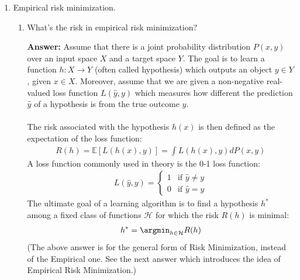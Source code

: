 \documentclass{article}
\newenvironment{QandA}{\begin{enumerate}[label=\arabic*.]}{\end{enumerate}}
\newenvironment{InnerQandA}{\begin{enumerate}[label=\roman*.]}{\end{enumerate}}
\newenvironment{answer}{\par\normalfont \textbf{Answer:}}{}
\newcommand{\Exp}[1]{\mathbb{E}\left[ #1 \right]}
\begin{document}
\begin{QandA}
\begin{answer}
        \textit{Active learning} is a branch of machine learning where a learning algorithm can interactively query a user (or some other information source) to label new data points with the desired outputs. (Source: \href{https://en.wikipedia.org/wiki/Active_learning}{Wikipedia}) \\\\
        \textit{Self-supervised learning} is a branch of machine learning that learns from unlabeled data by automatically extracting labels from the sample. For example, we could mask out a word in a sentence, which the algorithm then has to predict. (Source: \href{https://en.wikipedia.org/wiki/Self-supervised_learning}{Wikipedia})
    \end{answer}

    \item Empirical risk minimization.
    \begin{InnerQandA}
        \item What’s the risk in empirical risk minimization? 
        \begin{answer}
            Assume that there is a joint probability distribution $P(x, y)$ over an input space $X$ and a target space $Y$. The goal is to learn a function $h: X \rightarrow Y$ (often called hypothesis) which outputs an object $y \in Y$, given $x \in X$. Moreover, assume that we are given a non-negative real-valued loss function $L(\hat{y}, y)$ which measures how different the prediction $\hat{y}$ of a hypothesis is from the true outcome $y$. \\\\
            The risk associated with the hypothesis $h(x)$ is then defined as the expectation of the loss function:
            \begin{align*}
                R(h) = \Exp{L(h(x), y)} = \int L(h(x), y) dP(x, y)
            \end{align*}
            A loss function commonly used in theory is the 0-1 loss function:
            \begin{align*}
                L(\hat{y}, y) = \begin{cases}
                    1 &\text{if } \hat{y} \neq y \\
                    0 &\text{if } \hat{y} = y
                \end{cases}
            \end{align*}
            The ultimate goal of a learning algorithm is to find a hypothesis $h^*$ among a fixed class of functions $\mathcal{H}$ for which the risk $R(h)$ is minimal:
            \begin{align*}
                h^* = \argmin_{h \in \mathcal{H}} R(h)
            \end{align*}
            (The above answer is for the general form of Risk Minimization, instead of the Empirical one. See the next answer which introduces the idea of Empirical Risk Minimization.)
        \end{answer}


\end{InnerQandA}
\end{QandA}
\end{document}
